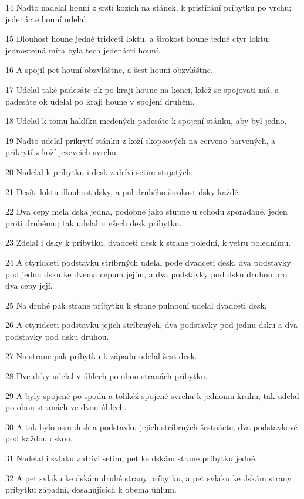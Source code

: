 \par 14 Nadto nadelal houní z srstí kozích na stánek, k pristírání príbytku po vrchu; jedenácte houní udelal.
\par 15 Dlouhost houne jedné tridceti loktu, a širokost houne jedné ctyr loktu; jednostejná míra byla tech jedenácti houní.
\par 16 A spojil pet houní obzvláštne, a šest houní obzvláštne.
\par 17 Udelal také padesáte ok po kraji houne na konci, kdež se spojovati má, a padesáte ok udelal po kraji houne v spojení druhém.
\par 18 Udelal k tomu haklíku medených padesáte k spojení stánku, aby byl jedno.
\par 19 Nadto udelal prikrytí stánku z koží skopcových na cerveno barvených, a prikrytí z koží jezevcích svrchu.
\par 20 Nadelal k príbytku i desk z dríví setim stojatých.
\par 21 Desíti loktu dlouhost dsky, a pul druhého širokost dsky každé.
\par 22 Dva cepy mela dska jedna, podobne jako stupne u schodu sporádané, jeden proti druhému; tak udelal u všech desk príbytku.
\par 23 Zdelal i dsky k príbytku, dvadceti desk k strane polední, k vetru polednímu.
\par 24 A ctyridceti podstavku stríbrných udelal pode dvadceti desk, dva podstavky pod jednu dsku ke dvema cepum jejím, a dva podstavky pod dsku druhou pro dva cepy její.
\par 25 Na druhé pak strane príbytku k strane pulnocní udelal dvadceti desk,
\par 26 A ctyridceti podstavku jejich stríbrných, dva podstavky pod jednu dsku a dva podstavky pod dsku druhou.
\par 27 Na strane pak príbytku k západu udelal šest desk.
\par 28 Dve dsky udelal v úhlech po obou stranách príbytku.
\par 29 A byly spojené po spodu a tolikéž spojené svrchu k jednomu kruhu; tak udelal po obou stranách ve dvou úhlech.
\par 30 A tak bylo osm desk a podstavku jejich stríbrných šestnácte, dva podstavkové pod každou dskou.
\par 31 Nadelal i svlaku z drívi setim, pet ke dskám strane príbytku jedné,
\par 32 A pet svlaku ke dskám druhé strany príbytku, a pet svlaku ke dskám strany príbytku západní, dosahujících k obema úhlum.
